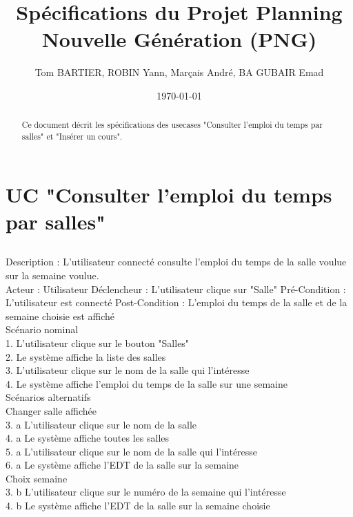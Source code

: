 \documentclass[12pt,a4paper]{article}
\title{Spécifications du Projet Planning Nouvelle Génération (PNG)}
\author{Tom BARTIER, ROBIN Yann, Marçais André, BA GUBAIR Emad}
\date{\today}
\begin{document}
\maketitle

\begin{abstract}
    Ce document décrit les spécifications des usecases "Consulter l'emploi du temps par salles" et 
    "Insérer un cours".
\end{abstract}

\section{UC "Consulter l'emploi du temps par salles"}
\subsection{}
Description : L'utilisateur connecté consulte l'emploi du temps de la salle voulue sur la semaine voulue.\\
Acteur : Utilisateur 
Déclencheur : L'utilisateur clique sur "Salle"
Pré-Condition : L'utilisateur est connecté
Post-Condition : L'emploi du temps de la salle et de la semaine choisie est affiché
\\

Scénario nominal\\
1. L'utilisateur clique sur le bouton "Salles"\\
2. Le système affiche la liste des salles\\
3. L'utilisateur clique sur le nom de la salle qui l'intéresse\\
4. Le système affiche l'emploi du temps de la salle sur une semaine\\

Scénarios alternatifs\\
Changer salle affichée\\
3. a L'utilisateur clique sur le nom de la salle\\
4. a Le système affiche toutes les salles\\
5. a L'utilisateur clique sur le nom de la salle qui l'intéresse\\
6. a Le système affiche l'EDT de la salle sur la semaine\\

Choix semaine\\
3. b L'utilisateur clique sur le numéro de la semaine qui l'intéresse\\
4. b Le système affiche l'EDT de la salle sur la semaine choisie\\
\end{document}
